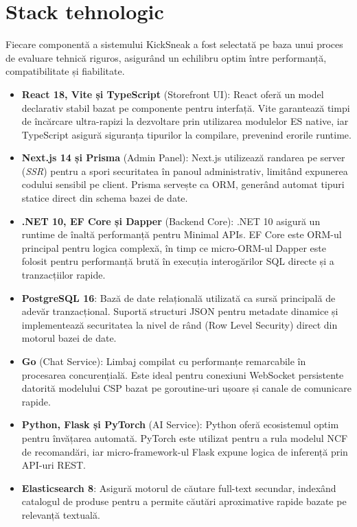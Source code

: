\section{Stack tehnologic}

Fiecare componentă a sistemului KickSneak a fost selectată pe baza unui proces de evaluare tehnică riguros, asigurând un echilibru optim între performanță, compatibilitate și fiabilitate.

\begin{itemize}
    \item \textbf{React 18, Vite și TypeScript} (Storefront UI): React oferă un model declarativ stabil bazat pe componente pentru interfață. Vite garantează timpi de încărcare ultra-rapizi la dezvoltare prin utilizarea modulelor ES native, iar TypeScript asigură siguranța tipurilor la compilare, prevenind erorile runtime.
    \item \textbf{Next.js 14 și Prisma} (Admin Panel): Next.js utilizează randarea pe server (\textit{SSR}) pentru a spori securitatea în panoul administrativ, limitând expunerea codului sensibil pe client. Prisma servește ca ORM, generând automat tipuri statice direct din schema bazei de date.
    \item \textbf{.NET 10, EF Core și Dapper} (Backend Core): .NET 10 asigură un runtime de înaltă performanță pentru Minimal APIs. EF Core este ORM-ul principal pentru logica complexă, în timp ce micro-ORM-ul Dapper este folosit pentru performanță brută în execuția interogărilor SQL directe și a tranzacțiilor rapide.
    \item \textbf{PostgreSQL 16}: Bază de date relațională utilizată ca sursă principală de adevăr tranzacțional. Suportă structuri JSON pentru metadate dinamice și implementează securitatea la nivel de rând (Row Level Security) direct din motorul bazei de date.
    \item \textbf{Go} (Chat Service): Limbaj compilat cu performanțe remarcabile în procesarea concurențială. Este ideal pentru conexiuni WebSocket persistente datorită modelului CSP bazat pe goroutine-uri ușoare și canale de comunicare rapide.
    \item \textbf{Python, Flask și PyTorch} (AI Service): Python oferă ecosistemul optim pentru învățarea automată. PyTorch este utilizat pentru a rula modelul NCF de recomandări, iar micro-framework-ul Flask expune logica de inferență prin API-uri REST.
    \item \textbf{Elasticsearch 8}: Asigură motorul de căutare full-text secundar, indexând catalogul de produse pentru a permite căutări aproximative rapide bazate pe relevanță textuală.

\end{itemize}
